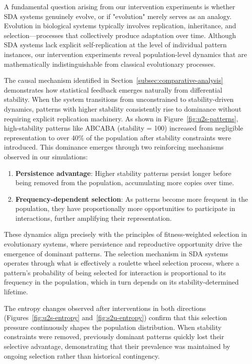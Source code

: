 \documentclass[preprint,12pt]{elsarticle}
\begin{document}
A fundamental question arising from our intervention experiments is whether SDA systems genuinely evolve, or if "evolution" merely serves as an analogy. Evolution in biological systems typically involves replication, inheritance, and selection—processes that collectively produce adaptation over time. Although SDA systems lack explicit self-replication at the level of individual pattern instances, our intervention experiments reveal population-level dynamics that are mathematically indistinguishable from classical evolutionary processes.

The causal mechanism identified in Section~\ref{subsec:comparative-analysis} demonstrates how statistical feedback emerges naturally from differential stability. When the system transitions from unconstrained to stability-driven dynamics, patterns with higher stability consistently rise to dominance without requiring explicit replication machinery. As shown in Figure~\ref{fig:u2s-patterns}, high-stability patterns like ABCABA (stability = 100) increased from negligible representation to over 40\% of the population after stability constraints were introduced. This dominance emerges through two reinforcing mechanisms observed in our simulations:
\begin{enumerate}
    \item \textbf{Persistence advantage}: Higher stability patterns persist longer before being removed from the population, accumulating more copies over time.
    \item \textbf{Frequency-dependent selection}: As patterns become more frequent in the population, they have proportionally more opportunities to participate in interactions, further amplifying their representation.
\end{enumerate}

These dynamics align precisely with the principles of fitness-weighted selection in evolutionary systems, where persistence and reproductive opportunity drive the emergence of dominant patterns. The selection mechanism in SDA systems operates through what is effectively a roulette wheel selection process, where a pattern's probability of being selected for interaction is proportional to its frequency in the population, which in turn depends on its stability-determined lifetime.

The entropy changes observed after interventions in both directions (Figures~\ref{fig:u2s-entropy} and~\ref{fig:s2u-entropy}) confirm that this selection pressure continuously shapes the population distribution. When stability constraints were removed, previously dominant patterns quickly lost their selective advantage, demonstrating that their prevalence was maintained by ongoing selection rather than historical contingency.
\end{document}
